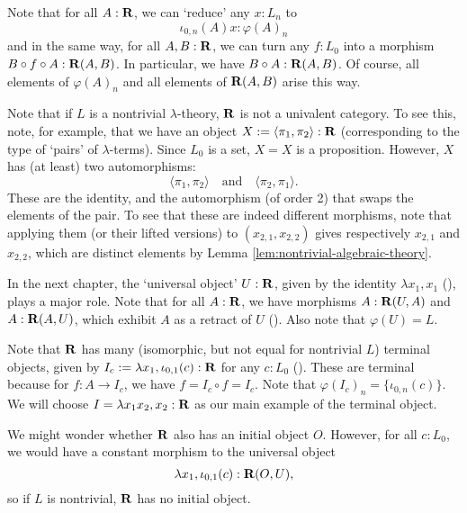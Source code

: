 \begin{remark}
  Note that for all $ A : \mathbf{R} $, we can `reduce' any $ x: L_n $ to
  \[ \iota_{0, n}(A) x : \varphi(A)_n \]
  and in the same way, for all $ A, B: \mathbf{R} $, we can turn any $ f: L_0 $ into a morphism $ B \circ f \circ A : \mathbf{R}(A, B) $. In particular, we have $ B \circ A : \mathbf{R}(A, B) $.
  Of course, all elements of $ \varphi(A)_n $ and all elements of $ \mathbf{R}(A, B) $ arise this way.
\end{remark}

\begin{remark}
  Note that if $ L $ is a nontrivial $ \lambda $-theory, $ \mathbf{R} $ is not a univalent category. To see this, note, for example, that we have an object $ X := \langle \pi_1, \pi_2 \rangle : \mathbf{R} $ (corresponding to the type of `pairs' of $ \lambda $-terms). Since $ L_0 $ is a set, $ X = X $ is a proposition. However, $ X $ has (at least) two automorphisms:
  \[ \langle \pi_1, \pi_2 \rangle \quad \text{and} \quad \langle \pi_2, \pi_1 \rangle. \]
  These are the identity, and the automorphism (of order 2) that swaps the elements of the pair. To see that these are indeed different morphisms, note that applying them (or their lifted versions) to $ (x_{2, 1}, x_{2, 2}) $ gives respectively $ x_{2, 1} $ and $ x_{2, 2} $, which are distinct elements by Lemma \ref{lem:nontrivial-algebraic-theory}.
\end{remark}

In the next chapter, the `universal object' $ U : \mathbf{R} $, given by the identity $ \lambda x_1, x_1 $ (), plays a major role. Note that for all $ A: \mathbf{R} $, we have morphisms $ A: \mathbf{R}(U, A) $ and $ A: \mathbf{R}(A, U) $, which exhibit $ A $ as a retract of $ U $ (). Also note that $ \varphi(U) = L $.

Note that $ \mathbf{R} $ has many (isomorphic, but not equal for nontrivial $ L $) terminal objects, given by $ I_c := \lambda x_1, \iota_{0, 1}(c) : \mathbf{R} $ for any $ c: L_0 $ (). These are terminal because for $ f: A \to I_c $, we have $ f = I_c \circ f = I_c $. Note that $ \varphi(I_c)_n = \{ \iota_{0, n}(c) \} $. We will choose $ I = \lambda x_1 x_2, x_2 : \mathbf{R} $ as our main example of the terminal object.

We might wonder whether $ \mathbf{R} $ also has an initial object $ O $. However, for all $ c: L_0 $, we would have a constant morphism to the universal object
\[ \lambda x_1, \iota_{0, 1}(c) : \mathbf{R}(O, U), \]
so if $ L $ is nontrivial, $ \mathbf{R} $ has no initial object.

